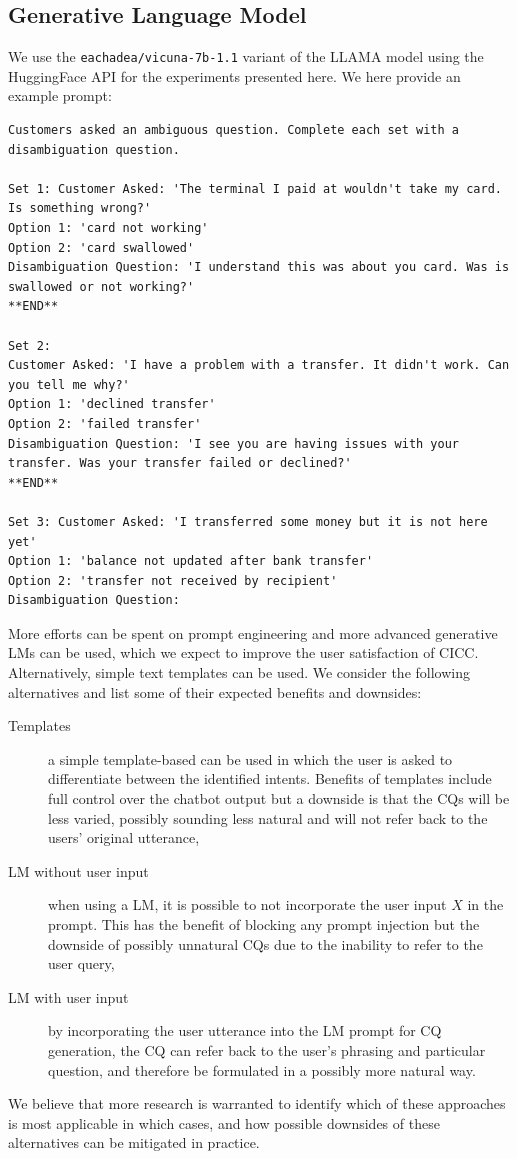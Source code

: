 \documentclass[11pt]{article}
\newcommand{\code}[1]{\colorbox{light-gray}{\texttt{#1}}}
\begin{document}
\subsection{Generative Language Model}
We use the \code{eachadea/vicuna-7b-1.1} variant of the LLAMA model using the HuggingFace API for the experiments presented here. We here provide an example prompt:
\begin{verbatim}
Customers asked an ambiguous question. Complete each set with a disambiguation question.

Set 1: Customer Asked: 'The terminal I paid at wouldn't take my card. Is something wrong?'
Option 1: 'card not working'
Option 2: 'card swallowed'
Disambiguation Question: 'I understand this was about you card. Was is swallowed or not working?'
**END**

Set 2:
Customer Asked: 'I have a problem with a transfer. It didn't work. Can you tell me why?'
Option 1: 'declined transfer'
Option 2: 'failed transfer'
Disambiguation Question: 'I see you are having issues with your transfer. Was your transfer failed or declined?'
**END**

Set 3: Customer Asked: 'I transferred some money but it is not here yet'
Option 1: 'balance not updated after bank transfer'
Option 2: 'transfer not received by recipient'
Disambiguation Question:
\end{verbatim}
\noindent More efforts can be spent on prompt engineering and more advanced generative LMs can be used, which we expect to improve the user satisfaction of CICC. Alternatively, simple text templates can be used. We consider the following alternatives and list some of their expected benefits and downsides:
\begin{description}
\item[Templates] a simple template-based can be used in which the user is asked to differentiate between the identified intents. Benefits of templates include full control over the chatbot output but a downside is that the CQs will be less varied, possibly sounding less natural and will not refer back to the users' original utterance,
\item[LM without user input] when using a LM, it is possible to not incorporate the user input $X$ in the prompt. This has the benefit of blocking any prompt injection but the downside of possibly unnatural CQs due to the inability to refer to the user query,
\item[LM with user input] by incorporating the user utterance into the LM prompt for CQ generation, the CQ can refer back to the user's phrasing and particular question, and therefore be formulated in a possibly more natural way.
\end{description}
We believe that more research is warranted to identify which of these approaches is most applicable in which cases, and how possible downsides of these alternatives can be mitigated in practice.
\end{document}
